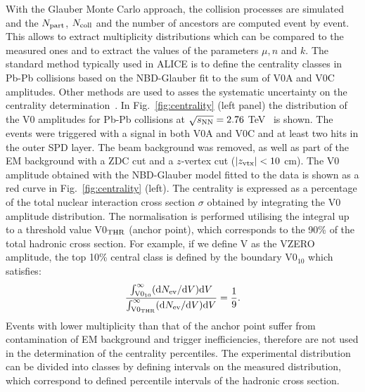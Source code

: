 With the Glauber Monte Carlo approach, the collision processes are simulated  
and the $N_{\rm part}$, $N_{\rm coll}$ and the number of ancestors are computed event by event. 
This allows to extract multiplicity distributions which can be compared to the measured ones and to extract the values of the parameters
$\mu, n $ and $k$.
The standard method typically used in ALICE is to define 
the centrality classes in Pb-Pb collisions based on the NBD-Glauber fit to the sum of V0A and V0C amplitudes. 
Other methods are used to asses the systematic uncertainty on the centrality determination~\cite{Abelev:2013qoq}.
In Fig.~\ref{fig:centrality} (left panel) the distribution of the V0 amplitudes for Pb-Pb collisions 
at $\sqrt{s_{\rm NN}}=2.76$ TeV~\cite{Abelev:2013qoq} is shown. The events were triggered with a signal in both V0A
and V0C and at least two hits in the outer SPD layer. The beam background was removed,
as well as part of the EM background with a ZDC cut and a $z$-vertex cut ($|z_{\rm vtx}|<10$ cm).
The V0 amplitude obtained with the NBD-Glauber model fitted to the data is shown as a red curve
 in Fig.~\ref{fig:centrality} (left). The centrality is expressed as a percentage of the total nuclear interaction cross section
$\sigma$ obtained by integrating the V0
amplitude distribution. The normalisation is performed utilising the integral up to a threshold value V0$_{\rm THR}$ (anchor point), which corresponds
to the 90\% of the total hadronic cross section. For example, if we define V as the VZERO amplitude, 
the top 10\% central class is defined by the boundary V0$_{10}$ which satisfies:
\begin{equation}
\label{eq:percentileV0}
\frac{\int_{{\rm V0}_{\rm 10}}^\infty ({\rm d }N_{\rm ev} / {\rm d}V) {\rm d}V}{\int_{{\rm V0}_{\rm THR}}^\infty ({\rm d }N_{\rm ev} / {\rm d}V) {\rm d}V} = \frac{1}{9}.
\end{equation}
 Events with lower multiplicity than that of the anchor point
suffer from contamination of EM background and trigger inefficiencies, therefore are not used
in the determination of the centrality percentiles. The experimental distribution can be divided into classes by defining intervals on the measured distribution, 
which correspond to defined percentile intervals of the hadronic cross section. 
